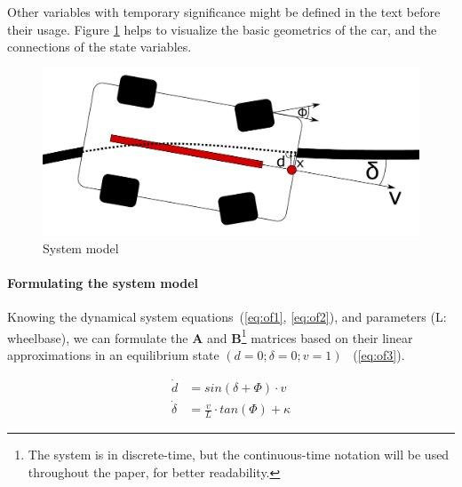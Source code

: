 Other variables with temporary significance might be defined in the text before their usage. Figure \ref{fig:cartop} helps to visualize the basic geometrics of the car, and the connections of the state variables.

\begin{figure}[!ht]
    \centering
    \includegraphics[width=0.7\linewidth]{img/cartop}
    \caption{System model}
    \label{fig:cartop}
\end{figure}

\paragraph{Formulating the system model}

Knowing the dynamical system equations~(\ref{eq:of1}, \ref{eq:of2}), and parameters (L: wheelbase), we can formulate the \textbf{A} and \textbf{B}\footnote{The system is in discrete-time, but the continuous-time notation will be used throughout the paper, for better readability.} matrices based on their linear approximations in an equilibrium state $(d = 0; \delta = 0; v = 1)$ ~(\ref{eq:of3}).

\begin{align} 
    \dot{d} &= sin(\delta + \Phi) \cdot v  \label{eq:of1} \\ 
    \dot{\delta} &= \frac{v}{L} \cdot tan(\Phi) + \kappa \label{eq:of2}
\end{align}

